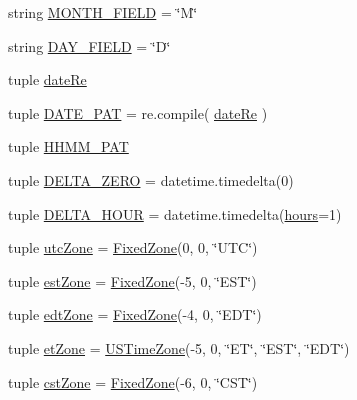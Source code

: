 \begin{DoxyCompactItemize}
\item 
string \hyperlink{namespaceamonpy_1_1sim_1_1sidereal_a24bbb70c569d2274730a610fd5380fee}{M\-O\-N\-T\-H\-\_\-\-F\-I\-E\-L\-D} = \char`\"{}M\char`\"{}
\item 
string \hyperlink{namespaceamonpy_1_1sim_1_1sidereal_ac01daf2e3ea4cf146f758cb9beab4b80}{D\-A\-Y\-\_\-\-F\-I\-E\-L\-D} = \char`\"{}D\char`\"{}
\item 
tuple \hyperlink{namespaceamonpy_1_1sim_1_1sidereal_a2af44303755d492213ebb82a6990b9b4}{date\-Re}
\item 
tuple \hyperlink{namespaceamonpy_1_1sim_1_1sidereal_a6c9f45aebca6543bb464d0f6477f1103}{D\-A\-T\-E\-\_\-\-P\-A\-T} = re.\-compile( \hyperlink{namespaceamonpy_1_1sim_1_1sidereal_a2af44303755d492213ebb82a6990b9b4}{date\-Re} )
\item 
tuple \hyperlink{namespaceamonpy_1_1sim_1_1sidereal_aa3d211b997762f17aeda244ab0bf4771}{H\-H\-M\-M\-\_\-\-P\-A\-T}
\item 
tuple \hyperlink{namespaceamonpy_1_1sim_1_1sidereal_ab96063e65dbd73e9f896b953e10576b3}{D\-E\-L\-T\-A\-\_\-\-Z\-E\-R\-O} = datetime.\-timedelta(0)
\item 
tuple \hyperlink{namespaceamonpy_1_1sim_1_1sidereal_a3766f520ebede113a6af900f31cad78c}{D\-E\-L\-T\-A\-\_\-\-H\-O\-U\-R} = datetime.\-timedelta(\hyperlink{namespaceamonpy_1_1sim_1_1sidereal_a8f427c645843461ab5c9c698fa37f43c}{hours}=1)
\item 
tuple \hyperlink{namespaceamonpy_1_1sim_1_1sidereal_a08eaf9ec6406ff09c3029f019cdd10f9}{utc\-Zone} = \hyperlink{classamonpy_1_1sim_1_1sidereal_1_1_fixed_zone}{Fixed\-Zone}(0, 0, \char`\"{}U\-T\-C\char`\"{})
\item 
tuple \hyperlink{namespaceamonpy_1_1sim_1_1sidereal_a24a02d8044a4126d459464bf644ea7cb}{est\-Zone} = \hyperlink{classamonpy_1_1sim_1_1sidereal_1_1_fixed_zone}{Fixed\-Zone}(-\/5, 0, \char`\"{}E\-S\-T\char`\"{})
\item 
tuple \hyperlink{namespaceamonpy_1_1sim_1_1sidereal_a7dc76e45276335e04963acaa48314678}{edt\-Zone} = \hyperlink{classamonpy_1_1sim_1_1sidereal_1_1_fixed_zone}{Fixed\-Zone}(-\/4, 0, \char`\"{}E\-D\-T\char`\"{})
\item 
tuple \hyperlink{namespaceamonpy_1_1sim_1_1sidereal_a29ebdf7098f9eb57a1f5c78fada23824}{et\-Zone} = \hyperlink{classamonpy_1_1sim_1_1sidereal_1_1_u_s_time_zone}{U\-S\-Time\-Zone}(-\/5, 0, \char`\"{}E\-T\char`\"{}, \char`\"{}E\-S\-T\char`\"{}, \char`\"{}E\-D\-T\char`\"{})
\item 
tuple \hyperlink{namespaceamonpy_1_1sim_1_1sidereal_a549980fae021a9a5bb945772f8dc525a}{cst\-Zone} = \hyperlink{classamonpy_1_1sim_1_1sidereal_1_1_fixed_zone}{Fixed\-Zone}(-\/6, 0, \char`\"{}C\-S\-T\char`\"{})

\end{DoxyCompactItemize}
